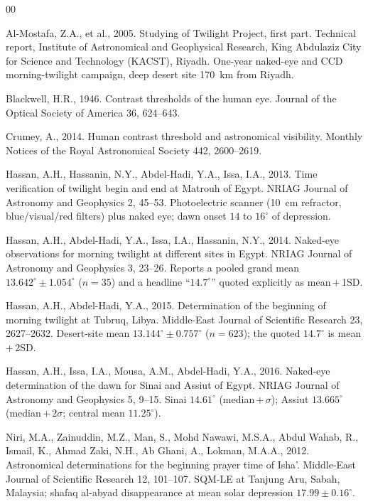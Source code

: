 \documentclass[preprint,12pt]{elsarticle}
\begin{document}

\begin{thebibliography}{00}

Al-Mostafa, Z.A., et al., 2005. Studying of Twilight Project, first
part. Technical report, Institute of Astronomical and Geophysical
Research, King Abdulaziz City for Science and Technology (KACST),
Riyadh. One-year naked-eye and CCD morning-twilight campaign, deep
desert site 170~km from Riyadh.

Blackwell, H.R., 1946. Contrast thresholds of the human eye. Journal of
the Optical Society of America 36, 624--643.

Crumey, A., 2014. Human contrast threshold and astronomical visibility.
Monthly Notices of the Royal Astronomical Society 442, 2600--2619.

Hassan, A.H., Hassanin, N.Y., Abdel-Hadi, Y.A., Issa, I.A., 2013.
Time verification of twilight begin and end at Matrouh of Egypt.
NRIAG Journal of Astronomy and Geophysics 2, 45--53. Photoelectric
scanner (10~cm refractor, blue/visual/red filters) plus naked eye;
dawn onset $14$ to $16^\circ$ of depression.

Hassan, A.H., Abdel-Hadi, Y.A., Issa, I.A., Hassanin, N.Y., 2014.
Naked-eye observations for morning twilight at different sites in Egypt.
NRIAG Journal of Astronomy and Geophysics 3, 23--26. Reports a pooled
grand mean $13.642^\circ \pm 1.054^\circ$ ($n=35$) and a headline
``$14.7^\circ$'' quoted explicitly as mean\,$+$\,1SD.

Hassan, A.H., Abdel-Hadi, Y.A., 2015. Determination of the beginning of
morning twilight at Tubruq, Libya. Middle-East Journal of Scientific
Research 23, 2627--2632. Desert-site mean $13.144^\circ \pm 0.757^\circ$
($n=623$); the quoted $14.7^\circ$ is mean\,$+$\,2SD.

Hassan, A.H., Issa, I.A., Mousa, A.M., Abdel-Hadi, Y.A., 2016. Naked-eye
determination of the dawn for Sinai and Assiut of Egypt. NRIAG Journal
of Astronomy and Geophysics 5, 9--15. Sinai $14.61^\circ$
(median\,$+\,\sigma$); Assiut $13.665^\circ$ (median\,$+\,2\sigma$;
central mean $11.25^\circ$).

Niri, M.A., Zainuddin, M.Z., Man, S., Mohd Nawawi, M.S.A., Abdul
Wahab, R., Ismail, K., Ahmad Zaki, N.H., Ab Ghani, A., Lokman,
M.A.A., 2012. Astronomical determinations for the beginning prayer
time of Isha'. Middle-East Journal of Scientific Research 12,
101--107. SQM-LE at Tanjung Aru, Sabah, Malaysia; shafaq al-abyad
disappearance at mean solar depression $17.99 \pm 0.16^\circ$.


\end{thebibliography}
\end{document}
